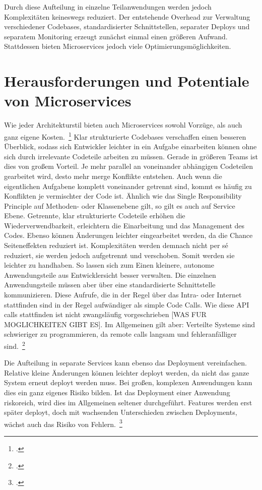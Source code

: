 Durch diese Aufteilung in einzelne Teilanwendungen werden jedoch Komplexitäten keineswegs reduziert. Der entstehende Overhead zur Verwaltung verschiedener Codebases, standardisierter Schnittstellen, separater Deploys und separatem Monitoring erzeugt zunächst einmal einen größeren Aufwand. Stattdessen bieten Microservices jedoch viele Optimierungsmöglichkeiten.

\section{Herausforderungen und Potentiale von Microservices}
Wie jeder Architekturstil bieten auch Microservices sowohl Vorzüge, als auch ganz eigene Kosten.~\footcite[vgl.][]{Fowler:Guide} 
Klar strukturierte Codebases verschaffen einen besseren Überblick, sodass sich Entwickler leichter in ein Aufgabe einarbeiten können ohne sich durch irrelevante Codeteile arbeiten zu müssen. Gerade in größeren Teams ist dies von großem Vorteil. Je mehr parallel an voneinander abhängigen Codeteilen gearbeitet wird, desto mehr merge Konflikte entstehen. Auch wenn die eigentlichen Aufgabene komplett voneinander getrennt sind, kommt es häufig zu Konflikten je vermischter der Code ist. Ähnlich wie das Single Responsibility Principle auf Methoden- oder Klassenebene gilt, so gilt es auch auf Service Ebene. Getrennte, klar strukturierte Codeteile erhöhen die Wiederverwendbarkeit, erleichtern die Einarbeitung und das Management des Codes. Ebenso können Änderungen leichter eingearbeitet werden, da die Chance Seiteneffekten reduziert ist. Komplexitäten werden demnach nicht per sé reduziert, sie werden jedoch aufgetrennt und verschoben. Somit werden sie leichter zu handhaben.
So lassen sich zum Einen kleinere, autonome Anwendungsteile aus Entwicklersicht besser verwalten. Die einzelnen Anwendungsteile müssen aber über eine standardisierte Schnittstelle kommunizieren. Diese Aufrufe, die in der Regel über das Intra- oder Internet stattfinden sind in der Regel aufwändiger als simple Code Calls. Wie diese API calls stattfinden ist nicht zwangsläufig vorgeschrieben [WAS FUR MOGLICHKEITEN GIBT ES]. Im Allgemeinen gilt aber: Verteilte Systeme sind schwieriger zu programmieren, da remote calls langsam und fehleranfälliger sind.~\footcite[vgl.][]{Fowler:Guide}

Die Aufteilung in separate Services kann ebenso das Deployment vereinfachen. Relative kleine Änderungen können leichter deployt werden, da nicht das ganze System erneut deployt werden muss. Bei großen, komplexen Anwendungen kann dies ein ganz eigenes Risiko bilden. Ist das Deployment einer Anwendung riskoreich, wird dies im Allgemeinen seltener durchgeführt. Features werden erst später deployt, doch mit wachsenden Unterschieden zwischen Deployments, wächst auch das Risiko von Fehlern.~\footcite[vgl.][]{newman2015building}

